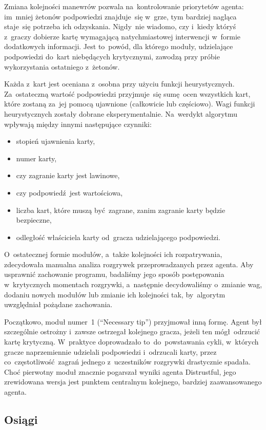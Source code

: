 \documentclass[declaration,shortabstract,inz]{iithesis}
\begin{document}
Zmiana kolejności manewrów pozwala na~kontrolowanie priorytetów agenta: im~mniej żetonów podpowiedzi znajduje~się w~grze, tym bardziej nagląca staje~się potrzeba ich odzyskania. Nigdy~nie wiadomo, czy i~kiedy któryś z~graczy dobierze kartę wymagającą natychmiastowej interwencji w~formie dodatkowych informacji. Jest to~powód, dla którego moduły, udzielające podpowiedzi do~kart niebędących krytycznymi, zawodzą przy próbie wykorzystania ostatniego z~żetonów.

Każda z~kart jest oceniana z~osobna przy użyciu funkcji heurystycznych. Za~ostateczną wartość podpowiedzi przyjmuje~się sumę ocen wszystkich kart, które zostaną za~jej pomocą ujawnione (całkowicie lub częściowo). Wagi funkcji heurystycznych zostały dobrane eksperymentalnie. Na~werdykt algorytmu wpływają między innymi następujące czynniki:
\begin{itemize}
	\item stopień ujawnienia karty,
	\item numer karty,
	\item czy zagranie karty jest lawinowe,
	\item czy podpowiedź jest wartościowa,
	\item liczba kart, które muszą być zagrane, zanim zagranie karty będzie bezpieczne,
	\item odległość właściciela karty od~gracza udzielającego podpowiedzi.
\end{itemize}

O~ostatecznej formie modułów, a~także kolejności ich rozpatrywania, zdecydowała manualna analiza rozgrywek przeprowadzanych przez agenta. Aby usprawnić zachowanie programu, badaliśmy jego sposób postępowania w~krytycznych momentach rozgrywki, a~następnie decydowaliśmy o~zmianie wag, dodaniu nowych modułów lub zmianie ich kolejności tak, by~algorytm uwzględniał pożądane zachowania.

Początkowo, moduł numer~1 (``Necessary tip'') przyjmował inną formę. Agent był szczególnie ostrożny i~zawsze ostrzegał kolejnego gracza, jeżeli ten mógł odrzucić kartę krytyczną. W~praktyce doprowadzało to~do~powstawania cykli, w~których gracze naprzemiennie udzielali podpowiedzi i~odrzucali karty, przez co~częstotliwość zagrań jednego z~uczestników rozgrywki drastycznie spadała. Choć pierwotny moduł znacznie pogarszał wyniki agenta Distrustful, jego zrewidowana wersja jest punktem centralnym kolejnego, bardziej zaawansowanego agenta.

\subsection*{Osiągi}
\end{document}
